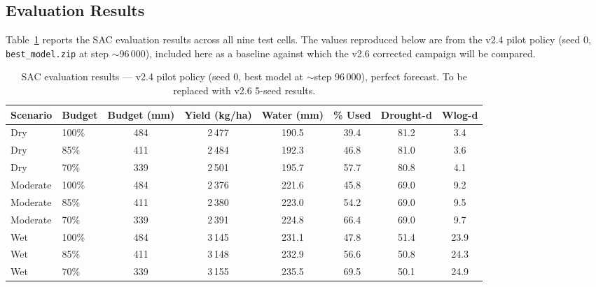 
\subsection{Evaluation Results}

Table~\ref{tab:sac_perfect} reports the SAC evaluation results across all nine test
cells. The values reproduced below are from the v2.4 pilot policy (seed 0,
\texttt{best\_model.zip} at step $\sim$96\,000), included here as a baseline against
which the v2.6 corrected campaign will be compared.


\begin{table}[ht]
\centering
\caption{SAC evaluation results — v2.4 pilot policy (seed 0, best model at
$\sim$step 96\,000), perfect forecast. To be replaced with v2.6 5-seed results.}
\label{tab:sac_perfect}
\begin{tabular}{llcccccc}
\hline
\textbf{Scenario} & \textbf{Budget} & \textbf{Budget (mm)} & \textbf{Yield (kg/ha)} & \textbf{Water (mm)} & \textbf{\% Used} & \textbf{Drought-d} & \textbf{Wlog-d} \\
\hline
Dry      & 100\% & 484 & 2\,477 & 190.5 & 39.4 & 81.2 & 3.4 \\
Dry      & 85\%  & 411 & 2\,484 & 192.3 & 46.8 & 81.0 & 3.6 \\
Dry      & 70\%  & 339 & 2\,501 & 195.7 & 57.7 & 80.8 & 4.1 \\
Moderate & 100\% & 484 & 2\,376 & 221.6 & 45.8 & 69.0 & 9.2 \\
Moderate & 85\%  & 411 & 2\,380 & 223.0 & 54.2 & 69.0 & 9.5 \\
Moderate & 70\%  & 339 & 2\,391 & 224.8 & 66.4 & 69.0 & 9.7 \\
Wet      & 100\% & 484 & 3\,145 & 231.1 & 47.8 & 51.4 & 23.9 \\
Wet      & 85\%  & 411 & 3\,148 & 232.9 & 56.6 & 50.8 & 24.3 \\
Wet      & 70\%  & 339 & 3\,155 & 235.5 & 69.5 & 50.1 & 24.9 \\
\hline
\end{tabular}
\end{table}

